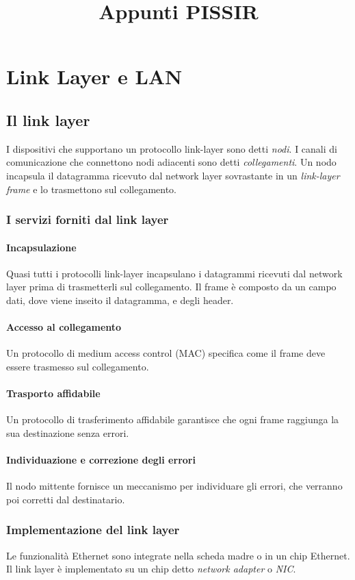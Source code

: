 \documentclass[11pt]{book}
\title{Appunti PISSIR}
\begin{document}
\chapter*{Link Layer e LAN}
\section*{Il link layer}
I dispositivi che supportano un protocollo link-layer sono detti \textit{nodi}. I canali di comunicazione che connettono
nodi adiacenti sono detti \textit{collegamenti}. Un nodo incapsula il datagramma ricevuto dal network layer sovrastante 
in un \textit{link-layer frame} e lo trasmettono sul collegamento.
\subsection*{I servizi forniti dal link layer}
\subsubsection*{Incapsulazione}
Quasi tutti i protocolli link-layer incapsulano i datagrammi ricevuti dal network layer prima di trasmetterli sul collegamento.
Il frame è composto da un campo dati, dove viene inseito il datagramma, e degli header.
\subsubsection*{Accesso al collegamento}
Un protocollo di medium access control (MAC) specifica come il frame deve essere trasmesso sul collegamento. 
\subsubsection*{Trasporto affidabile}
Un protocollo di trasferimento affidabile garantisce che ogni frame raggiunga la sua destinazione senza errori.
\subsubsection*{Individuazione e correzione degli errori}
Il nodo mittente fornisce un meccanismo per individuare gli errori, che verranno poi corretti dal destinatario.
\subsection*{Implementazione del link layer}
Le funzionalità Ethernet sono integrate nella scheda madre o in un chip Ethernet. Il link layer è implementato su un chip 
detto \textit{network adapter} o \textit{NIC}. 
\end{document}
